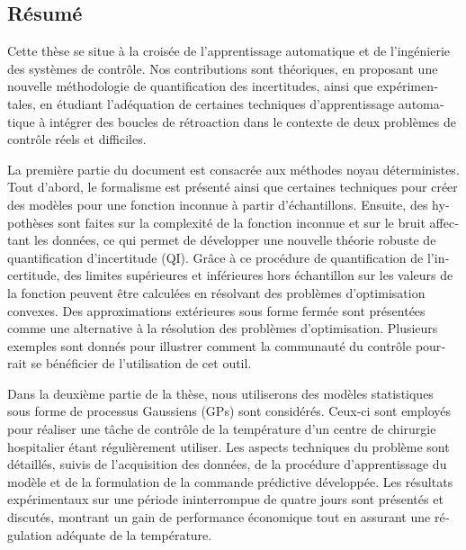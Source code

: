 %

\begin{otherlanguage}{french}
\cleardoublepage

\chapter*{Résumé}

Cette thèse se situe à la croisée de l'apprentissage automatique et de l'ingénierie des systèmes de contrôle. Nos contributions sont théoriques, en proposant une nouvelle méthodologie de quantification des incertitudes, ainsi que expérimentales, en étudiant l'adéquation de certaines techniques d'apprentissage automatique à intégrer des boucles de rétroaction dans le contexte de deux problèmes de contrôle réels et difficiles.

La première partie du document est consacrée aux méthodes noyau déterministes. Tout d'abord, le formalisme est présenté ainsi que certaines techniques pour créer des modèles pour une fonction inconnue à partir d'échantillons. Ensuite, des hypothèses sont faites sur la complexité de la fonction inconnue et sur le bruit affectant les données, ce qui permet de développer une nouvelle théorie robuste de quantification d'incertitude (QI). Grâce à ce procédure de quantification de l'incertitude, des limites supérieures et inférieures hors échantillon sur les valeurs de la fonction peuvent être calculées en résolvant des problèmes d'optimisation convexes. Des approximations extérieures sous forme fermée sont présentées comme une alternative à la résolution des problèmes d'optimisation. Plusieurs exemples sont donnés pour illustrer comment la communauté du contrôle pourrait se bénéficier de l'utilisation de cet outil.

Dans la deuxième partie de la thèse, nous utiliserons des modèles statistiques sous forme de processus Gaussiens (GPs) sont considérés. Ceux-ci sont employés pour réaliser une tâche de contrôle de la température d'un centre de chirurgie hospitalier étant régulièrement utiliser. Les aspects techniques du problème sont détaillés, suivis de l'acquisition des données, de la procédure d'apprentissage du modèle et de la formulation de la commande prédictive développée. Les résultats expérimentaux sur une période ininterrompue de quatre jours sont présentés et discutés, montrant un gain de performance économique tout en assurant une régulation adéquate de la température.


\end{otherlanguage}
